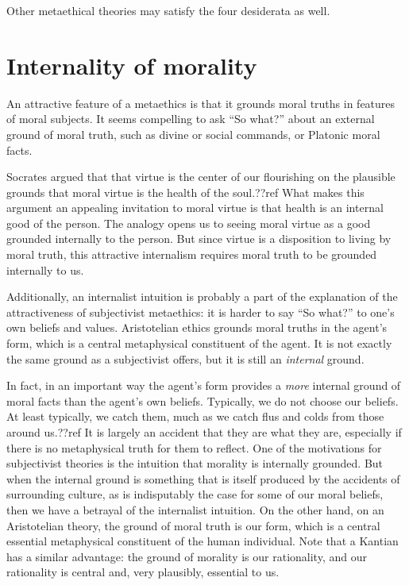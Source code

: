 Other metaethical theories may satisfy the four desiderata as well.

\section{Internality of morality}
An attractive feature of a metaethics is that it grounds moral truths in features of moral subjects. It seems 
compelling to ask ``So what?'' about an external ground of moral truth, such as divine or social commands, or Platonic 
moral facts. 

Socrates argued that that virtue is the center of our flourishing on the plausible grounds that moral virtue is the health 
of the soul.??ref What makes this argument an appealing invitation to moral virtue is that health is an internal good of 
the person. The analogy opens us to seeing moral virtue as a good grounded internally to the person. But since virtue
is a disposition to living by moral truth, this attractive internalism requires moral truth to be grounded internally
to us.

Additionally, an internalist intuition is probably a part of the explanation of the 
attractiveness of subjectivist metaethics: it is harder to say ``So what?'' to one's own beliefs and values. 
Aristotelian ethics grounds moral truths in the agent's form, which is a central metaphysical constituent of the agent.
It is not exactly the same ground as a subjectivist offers, but it is still an \textit{internal} ground.

In fact, in an important way the agent's form provides a \textit{more} internal ground of moral facts than the 
agent's own beliefs. Typically, we do not choose our beliefs. At least typically, we catch them, much as we 
catch flus and colds from those around us.??ref It is largely an accident that they are what they are, especially 
if there is no metaphysical truth for them to reflect. One of the motivations for subjectivist theories is 
the intuition that morality is internally grounded. But when the internal ground is something that is itself
produced by the accidents of surrounding culture, as is indisputably the case for some of our moral beliefs, 
then we have a betrayal of the internalist intuition. On the other hand, on an Aristotelian theory, the ground 
of moral truth is our form, which is a central essential metaphysical constituent of the human individual. 
Note that a Kantian has a similar advantage: the ground of morality is our rationality, and our rationality
is central and, very plausibly, essential to us.

